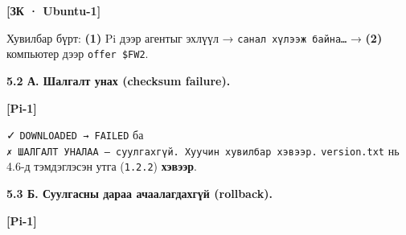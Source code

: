 \textbf{{[}ЗК · Ubuntu-1{]}}

\begin{Shaded}
\begin{Highlighting}[]
\OperatorTok{\textgreater{}}
 \KeywordTok{\textbackslash{}}
        \KeywordTok{|} \VariableTok{)}
  \KeywordTok{|} 
\end{Highlighting}
\end{Shaded}

Хувилбар бүрт: \textbf{(1)} Pi дээр агентыг эхлүүл → \texttt{санал\ хүлээж\ байна\ldots{}} → \textbf{(2)} компьютер дээр \texttt{offer\ \$FW2}.

\textbf{5.2 А. Шалгалт унах (checksum failure).}

\textbf{{[}Pi-1{]}}

\begin{Shaded}
\begin{Highlighting}[]
 \KeywordTok{\textbackslash{}}
  \KeywordTok{|} 
\end{Highlighting}
\end{Shaded}

✓ \texttt{DOWNLOADED\ →\ FAILED} ба \texttt{✗\ ШАЛГАЛТ\ УНАЛАА\ —\ суулгахгүй.\allowbreak{}\ Хуучин\ хувилбар\ хэвээр.\allowbreak{}} \texttt{version.txt} нь 4.6-д тэмдэглэсэн утга (\texttt{1.2.2}) \textbf{хэвээр}.

\textbf{5.3 Б. Суулгасны дараа ачаалагдахгүй (rollback).}

\textbf{{[}Pi-1{]}}

\begin{Shaded}
\begin{Highlighting}[]
 \KeywordTok{\textbackslash{}}
  \KeywordTok{|} 
\end{Highlighting}
\end{Shaded}

